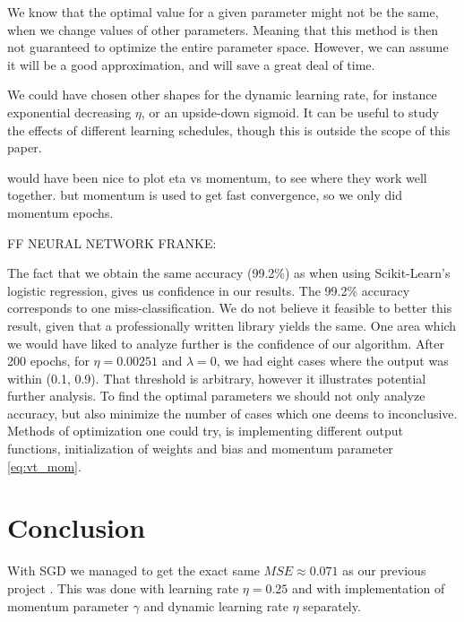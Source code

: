 \documentclass[12pt]{extarticle}
\begin{document}
We know that the optimal value for a given parameter might not be the same, when we change values of other parameters. Meaning that this method is then not guaranteed to optimize the entire parameter space. However, we can assume it will be a good approximation, and will save a great deal of time.

We could have chosen other shapes for the dynamic learning rate, for instance exponential decreasing $\eta$, or an upside-down sigmoid. It can be useful to study the effects of different learning schedules, though this is outside the scope of this paper.

would have been nice to plot eta vs momentum, to see where they work well together. but momentum is used to get fast convergence, so we only did momentum epochs.

FF NEURAL NETWORK FRANKE:




The fact that we obtain the same accuracy (99.2\%) as when using Scikit-Learn's logistic regression, gives us confidence in our results. The 99.2\% accuracy corresponds to one miss-classification. We do not believe it feasible to better this result, given that a professionally written library yields the same. One area which we would have liked to analyze further is the confidence of our algorithm. After 200 epochs, for $\eta = 0.00251$ and $\lambda = 0$, we had eight cases where the output was within (0.1, 0.9). That threshold is arbitrary, however it illustrates potential further analysis. To find the optimal parameters we should not only analyze accuracy, but also minimize the number of cases which one deems to inconclusive. Methods of optimization one could try, is implementing different output functions, initialization of weights and bias and momentum parameter \eqref{eq:vt_mom}.

\section{Conclusion}
With SGD we managed to get the exact same $MSE \approx 0.071$ as our previous project \cite{project1}. This was done with learning rate $\eta = 0.25$ and with implementation of momentum parameter $\gamma$ and dynamic learning rate $\eta$ separately.




\end{document}
